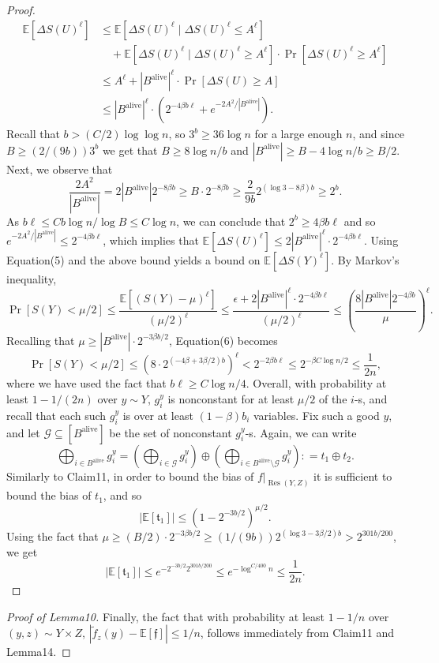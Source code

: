 \documentclass[10pt,a4paper]{article}
\begin{document}
\begin{proof}
\begin{align*}
\mathbb E[\Delta S(U)^\ell]
&\le\mathbb E[\Delta S(U)^\ell\mid\Delta S(U)^\ell\le A^\ell]\\
&\quad+\mathbb E[\Delta S(U)^\ell\mid\Delta S(U)^\ell\ge A^\ell]\cdot\Pr[\Delta S(U)^\ell\ge A^\ell]\\
&\le A^\ell+|B^{\mathrm{alive}}|^\ell\cdot\Pr[\Delta S(U)\ge A]\\
&\le|B^{\mathrm{alive}}|^\ell\cdot(2^{-4\beta b\ell}+e^{-2A^2/|B^{\mathrm{alive}}|}).
\end{align*}
Recall that $b>(C/2)\log\log n$, so $3^b\ge36\log n$ for a large enough $n$, and since $B\ge(2/(9b))3^b$ we get that $B\ge8\log n/b$ and $|B^{\mathrm{alive}}|\ge B-4\log n/b\ge B/2$. Next, we observe that
\[
\frac{2A^2}{|B^{\mathrm{alive}}|}=2|B^{\mathrm{alive}}|2^{-8\beta b}
\ge B\cdot2^{-8\beta b}
\ge\frac2{9b}2^{(\log3-8\beta)b}\ge2^b.
\]
As $b\ell\le Cb\log n/\log B\le C\log n$, we can conclude that $2^b\ge4\beta b\ell$ and so $e^{-2A^2/|B^{\mathrm{alive}}|}\le2^{-4\beta b\ell}$, which implies that $\mathbb E[\Delta S(U)^\ell]\le2|B^{\mathrm{alive}}|^\ell\cdot2^{-4\beta b\ell}$.
Using Equation(5) and the above bound yields a bound on $\mathbb E[\Delta S(Y)^\ell]$. By Markov's inequality,
\begin{equation}
\Pr[S(Y)<\mu/2]\le\frac{\mathbb E[(S(Y)-\mu)^\ell]}{(\mu/2)^\ell}
\le\frac{\epsilon+2|B^{\mathrm{alive}}|^\ell\cdot2^{-4\beta b\ell}}{(\mu/2)^\ell}
\le\left(\frac{8|B^{\mathrm{alive}}|2^{-4\beta b}}{\mu}\right)^\ell.\tag{6}
\end{equation}
Recalling that $\mu\ge|B^{\mathrm{alive}}|\cdot2^{-3\beta b/2}$, Equation(6) becomes
\[
\Pr[S(Y)<\mu/2]\le(8\cdot2^{(-4\beta+3\beta/2)b})^\ell
<2^{-2\beta b\ell}\le2^{-\beta C\log n/2}\le\frac1{2n},
\]
where we have used the fact that $b\ell\ge C\log n/4$.
Overall, with probability at least $1-1/(2n)$ over $y\sim Y$, $g_i^y$ is nonconstant for at least $\mu/2$ of the $i$-s, and recall that each such $g_i^y$ is over at least $(1-\beta)b_i$ variables. Fix such a good $y$, and let $\mathcal G\subseteq[B^{\mathrm{alive}}]$ be the set of nonconstant $g_i^y$-s. Again, we can write
\[
\bigoplus_{i\in B^{\mathrm{alive}}}g_i^y
=\left(\bigoplus_{i\in\mathcal G}g_i^y\right)\oplus\left(\bigoplus_{i\in B^{\mathrm{alive}}\setminus\mathcal G}g_i^y\right)
\mathrel{\mathop:}=t_1\oplus t_2.
\]
Similarly to Claim11, in order to bound the bias of $f|_{\operatorname{Res}(Y,Z)}$ it is sufficient to bound the bias of $t_1$, and so
\[
|\mathbb E[\mathfrak t_1]|\le(1-2^{-3b/2})^{\mu/2}.
\]
Using the fact that $\mu\ge(B/2)\cdot2^{-3\beta b/2}\ge(1/(9b))2^{(\log3-3\beta/2)b}>2^{301b/200}$, we get
\[
|\mathbb E[\mathfrak t_1]|\le e^{-2^{-3b/2}2^{301b/200}}\le e^{-\log^{C/400}n}\le\frac1{2n}.
\]
\end{proof}
\begin{proof}[Proof of Lemma10]
Finally, the fact that with probability at least $1-1/n$ over $(y,z)\sim Y\times Z$, $|\widetilde f_z(y)-\mathbb E[\mathfrak f]|\le1/n$, follows immediately from Claim11 and Lemma14.
\end{proof}
\end{document}
